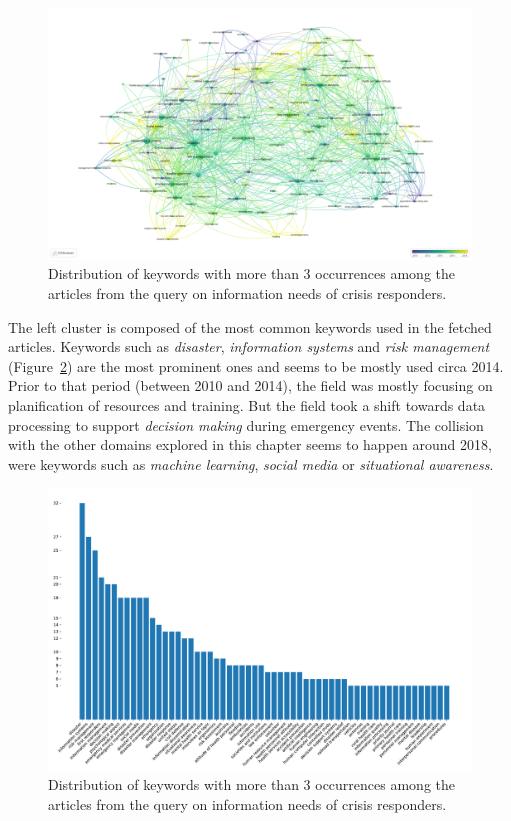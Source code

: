 \begin{landscape}
    \begin{figure}[htb]
        \includegraphics[width=\paperwidth,height=\paperheight,keepaspectratio]{figures/chap-2/business-needs-overlay.pdf}
        \caption{Distribution of keywords with more than 3 occurrences among the articles from the query on information needs of crisis responders.}
        \label{literature:business-needs-overlay}
    \end{figure}
\end{landscape}

The left cluster is composed of the most common keywords used in the fetched articles.
Keywords such as \emph{disaster}, \emph{information systems} and \emph{risk management} (Figure~\ref{literature:business-needs-bar}) are the most prominent ones and seems to be mostly used circa 2014.
Prior to that period (between 2010 and 2014), the field was mostly focusing on planification of resources and training.
But the field took a shift towards data processing to support \emph{decision making} during emergency events.
The collision with the other domains explored in this chapter seems to happen around 2018, were keywords such as \emph{machine learning}, \emph{social media} or \emph{situational awareness}.

\begin{figure}[htb]
    \centering
    \includegraphics[width=\textwidth]{figures/chap-2/business-needs-bar.pdf}
    \caption{Distribution of keywords with more than 3 occurrences among the articles from the query on information needs of crisis responders.}
    \label{literature:business-needs-bar}
\end{figure}

